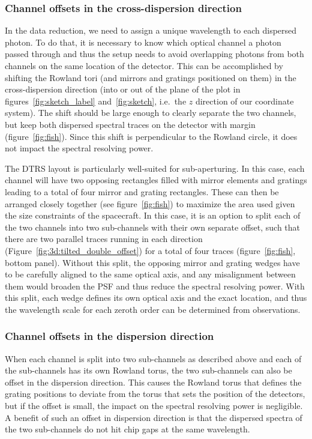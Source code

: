 \documentclass[linenumbers]{aastex631}
\begin{document}
\subsubsection{Channel offsets in the cross-dispersion direction}
In the data reduction, we need to assign a unique wavelength to each dispersed photon. To do that, it is necessary to know which optical channel a photon passed through and thus the setup needs to avoid overlapping photons from both channels on the same location of the detector. This can be accomplished by shifting the Rowland tori (and mirrors and gratings positioned on them) in the cross-dispersion direction (into or out of the plane of the plot in figures~\ref{fig:sketch_label} and~\ref{fig:sketch}, i.e.\ the $z$ direction of our coordinate system). The shift should be large enough to clearly separate the two channels, but keep both dispersed spectral traces on the detector with margin (figure~\ref{fig:fish}). Since this shift is perpendicular to the Rowland circle, it does not impact the spectral resolving power.

The DTRS layout is particularly well-suited for sub-aperturing. In this case, each channel will have two opposing rectangles filled with mirror elements and gratings leading to a total of four mirror and grating rectangles. These can then be arranged closely together (see figure~\ref{fig:fish}) to maximize the area used given the size constraints of the spacecraft. In this case, it is an option to split each of the two channels into two sub-channels with their own separate offset, such that there are two parallel traces running in each direction (Figure~\ref{fig:3d:tilted_double_offset}) for a total of four traces (figure~\ref{fig:fish}, bottom panel). Without this split, the opposing mirror and grating wedges have to be carefully aligned to the same optical axis, and any misalignment between them would broaden the PSF and thus reduce the spectral resolving power. With this split, each wedge defines its own optical axis and the exact location, and thus the wavelength scale for each zeroth order can be determined from observations.

\subsubsection{Channel offsets in the dispersion direction}
When each channel is split into two sub-channels as described above and each of the sub-channels has its own Rowland torus, %
the two sub-channels can also be offset in the dispersion direction. This causes the Rowland torus that defines the grating positions to deviate from the torus that sets the position of the detectors, but if the offset is small, the impact on the spectral resolving power is negligible. A benefit of such an offset in dispersion direction is that the dispersed spectra of the two sub-channels do not hit chip gaps at the same wavelength. %
\end{document}
